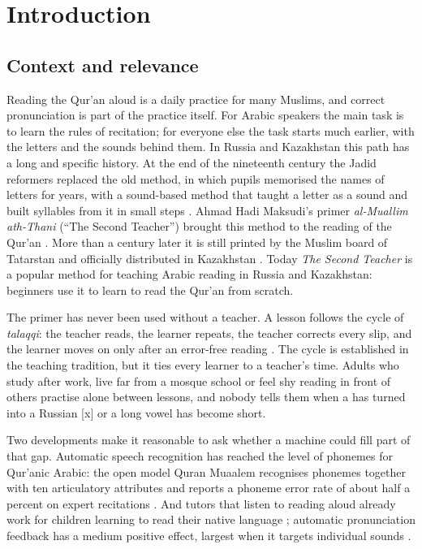 \chapter{Introduction}\label{ch:intro}

\section{Context and relevance}

Reading the Qur'an aloud is a daily practice for many Muslims, and correct pronunciation is part of the
practice itself. For Arabic speakers the main task is to learn the rules of recitation; for everyone else
the task starts much earlier, with the letters and the sounds behind them. In Russia and Kazakhstan this
path has a long and specific history. At the end of the nineteenth century the Jadid reformers replaced
the old method, in which pupils memorised the names of letters for years, with a sound-based method that
taught a letter as a sound and built syllables from it in small steps \cite{SRC-016,SRC-017}. Ahmad Hadi
Maksudi's primer \emph{al-Muallim ath-Thani} (``The Second Teacher'') brought this method to the reading of the
Qur'an \cite{SRC-015,SRC-018}. More than a century later it is still printed by the Muslim board of Tatarstan and
officially distributed in Kazakhstan \cite{SRC-040,SRC-020}. Today \emph{The Second Teacher} is a popular
method for teaching Arabic reading in Russia and Kazakhstan: beginners use it to learn to read the Qur'an from
scratch.

The primer has never been used without a teacher. A lesson follows the cycle of \emph{talaqqi}: the
teacher reads, the learner repeats, the teacher corrects every slip, and the learner moves on only after an
error-free reading \cite{SRC-021,SRC-058}. The cycle is established in the teaching tradition, but it ties every learner to a teacher's
time. Adults who study after work, live far from a mosque school or feel shy reading in front of others
practise alone between lessons, and nobody tells them when a  has turned into a Russian [x] or a long
vowel has become short.

Two developments make it reasonable to ask whether a machine could fill part of that gap. Automatic speech
recognition has reached the level of phonemes for Qur'anic Arabic: the open model Quran Muaalem recognises
phonemes together with ten articulatory attributes and reports a phoneme error rate of about half a percent
on expert recitations \cite{SRC-002}. And tutors that listen to reading aloud already work for children
learning to read their native language \cite{SRC-125,SRC-130,SRC-132}; automatic pronunciation feedback has a
medium positive effect, largest when it targets individual sounds \cite{SRC-025}.

